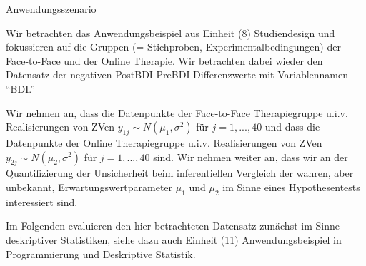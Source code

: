 \documentclass[
  8pt,
  ignorenonframetext,
]{beamer}
\begin{document}
\begin{frame}{Anwendungsszenario}
\protect\hypertarget{anwendungsszenario-7}{}
\small

Wir betrachten das Anwendungsbeispiel aus Einheit (8) Studiendesign und
fokussieren auf die Gruppen (= Stichproben, Experimentalbedingungen) der
Face-to-Face und der Online Therapie. Wir betrachten dabei wieder den
Datensatz der negativen PostBDI-PreBDI Differenzwerte mit Variablennamen
``BDI.'' \vspace{3mm}

Wir nehmen an, dass die Datenpunkte der Face-to-Face Therapiegruppe
u.i.v. Realisierungen von ZVen \(y_{1j} \sim N(\mu_1,\sigma^2)\) für
\(j = 1,...,40\) und dass die Datenpunkte der Online Therapiegruppe
u.i.v. Realisierungen von ZVen \(y_{2j} \sim N(\mu_2,\sigma^2)\) für
\(j = 1,...,40\) sind. Wir nehmen weiter an, dass wir an der
Quantifizierung der Unsicherheit beim inferentiellen Vergleich der
wahren, aber unbekannt, Erwartungswertparameter \(\mu_1\) und \(\mu_2\)
im Sinne eines Hypothesentests interessiert sind. \vspace{3mm}

Im Folgenden evaluieren den hier betrachteten Datensatz zunächst im
Sinne deskriptiver Statistiken, siehe dazu auch Einheit (11)
Anwendungsbeispiel in Programmierung und Deskriptive Statistik.
\end{frame}
\end{document}
